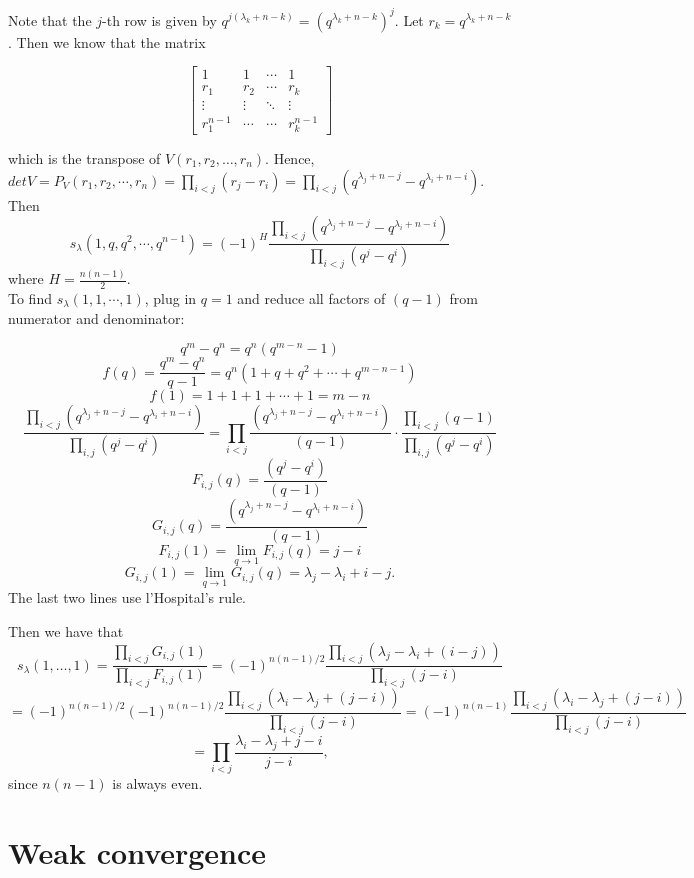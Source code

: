 \documentclass[12pt]{article}
\begin{document}
Note that the $j$-th row is given by $q^{j(\lambda_k + n - k)}  = (q^{\lambda_k + n - k})^j$. Let $r_k = q^{\lambda_k + n - k}$. Then we know that the matrix

$$\begin{bmatrix} 1 & 1 & \cdots & 1 \\
r_1 & r_2 & \cdots & r_k \\
\vdots & \vdots & \ddots & \vdots \\
r_1^{n-1} & \cdots & \cdots & r_k^{n-1} 
\end{bmatrix} $$

which is the transpose of $V(r_1, r_2, \dots, r_n)$. Hence, $det V = P_V (r_1, r_2, \cdots, r_n) = \prod_{i < j} (r_j - r_i) = \prod _{i < j} ( q^{\lambda_j + n - j} - q^{\lambda_i + n - i} )$. Then 
$$s_\lambda(1, q, q^2, \cdots, q^{n-1}) = (-1)^H \frac{\prod_{i < j} (q^{\lambda_j + n - j} - q^{\lambda_i + n - i} )}{\prod_{i<j} (q^j - q^ i)}$$
where $H = \frac{n(n-1)}{2}$.\\

To find $s_\lambda(1, 1, \cdots, 1)$, plug in $q = 1$ and reduce all factors of $(q-1)$ from numerator and denominator:

$$q^m - q^n  = q^n(q^{m-n} - 1)$$
$$f(q) = \frac{q^m - q^n}{q-1} = q^n(1 + q + q^2 + \cdots + q^{m -n -1} )$$
$$f(1) = 1 + 1 + 1 + \cdots + 1 = m - n$$
$$\frac{\prod_{i < j} (q^{\lambda_j + n - j} - q^{\lambda_i + n - i} )}{
\prod_{i, j} (q^j - q^ i)} =  \prod_{i < j} \frac{(q^{\lambda_j + n - j} - q^{\lambda_i + n - i} )}{(q - 1)}\cdot\frac{\prod_{i<j}(q - 1)}{\prod_{i, j} (q^j - q^i)}$$
$$F_{i, j}(q)  = \frac{(q^j - q^i)}{(q - 1)}$$
$$G_{i, j}(q) = \frac{(q^{\lambda_j + n - j} - q^{\lambda_i + n - i})}{ (q - 1)}$$ 
$$F_{i, j}(1) = \lim_{q\to 1} F_{i,j}(q) = j - i $$
$$G_{i, j}(1)  = \lim_{q\to 1} G_{i,j}(q) = \lambda_j - \lambda_i + i - j.$$
The last two lines use l'Hospital's rule.

Then we have that
$$s_\lambda(1,\dots,1) = \frac{\prod_{i< j} G_{i, j}(1)}{\prod_{i< j} F_{i, j}(1)}
= (-1)^{n(n-1)/2} \frac{\prod_{i< j}  (\lambda_j - \lambda_i + (i - j))}{\prod _{i < j} ( j- i)}$$
$$= (-1)^{n(n-1)/2} (-1)^{n(n-1)/2} \frac{\prod_{i< j}  (\lambda_i - \lambda_j + (j -i))}{\prod _{i < j} (j- i)} = (-1)^{n(n-1)} \frac{\prod_{i< j}  (\lambda_i - \lambda_j + (j-i))}{\prod _{i < j } ( j- i)}$$
$$= \prod_{i< j}  \frac{\lambda_i - \lambda_j + j -i}{j-i},$$
since $n(n-1)$ is always even.


\section{Weak convergence}
\end{document}

